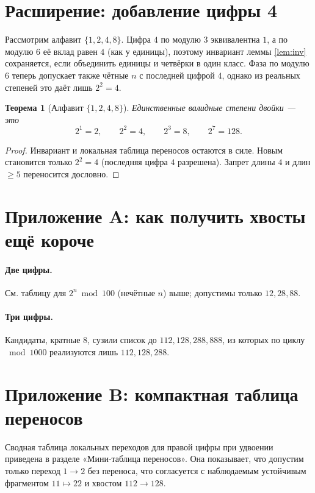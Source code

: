 \documentclass[12pt]{article}
\theoremstyle{plain}
\newtheorem{theorem}{Теорема}
\theoremstyle{remark}
\begin{document}
\section{Расширение: добавление цифры 4}
Рассмотрим алфавит $\{1,2,4,8\}$. Цифра $4$ по модулю $3$ эквивалентна $1$, а по модулю $6$ её вклад равен $4$ (как у единицы), поэтому инвариант леммы \ref{lem:inv} сохраняется, если объединить единицы и четвёрки в один класс. Фаза по модулю $6$ теперь допускает также чётные $n$ с последней цифрой $4$, однако из реальных степеней это даёт лишь $2^2=4$.

\begin{theorem}[Алфавит $\{1,2,4,8\}$]
Единственные валидные степени двойки — это
\[
2^1=2,\qquad 2^2=4,\qquad 2^3=8,\qquad 2^7=128.
\]
\end{theorem}

\begin{proof}
Инвариант и локальная таблица переносов остаются в силе. Новым становится только $2^2=4$ (последняя цифра $4$ разрешена). Запрет длины $4$ и длин $\ge5$ переносится дословно.
\end{proof}

\section*{Приложение A: как получить хвосты ещё короче}
\paragraph{Две цифры.} См. таблицу для $2^n\bmod100$ (нечётные $n$) выше; допустимы только $12,28,88$.
\paragraph{Три цифры.} Кандидаты, кратные $8$, сузили список до $112,128,288,888$, из которых по циклу $\bmod1000$ реализуются лишь $112,128,288$.

\section*{Приложение B: компактная таблица переносов}
Сводная таблица локальных переходов для правой цифры при удвоении приведена в разделе «Мини-таблица переносов». Она показывает, что допустим только переход $1\to2$ без переноса, что согласуется с наблюдаемым устойчивым фрагментом $11\mapsto22$ и хвостом $112\to128$.
\end{document}
